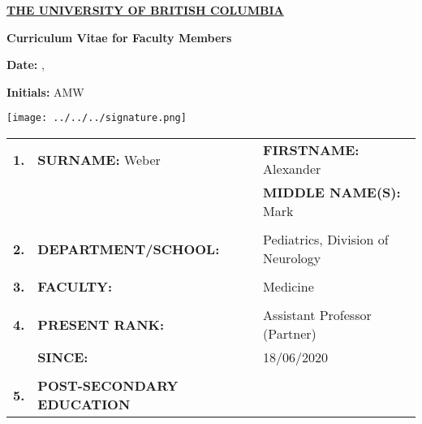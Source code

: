 \documentclass[11pt,notitlepage,english]{report}
\makeatletter
\newcommand{\monthyeardate}{%
  \DTMenglishmonthname{\@dtm@month}, \@dtm@year
}
\makeatother
\begin{document}
\begin{center}
  \underline{\textbf{THE UNIVERSITY OF BRITISH COLUMBIA}}
  \vspace{10pt}

  \textbf{Curriculum Vitae for Faculty Members}
\end{center}

\noindent %
\begin{minipage}[t]{0.33\textwidth}
  \raggedright
  \textbf{Date:} \monthyeardate
\end{minipage}%
\begin{minipage}[t]{0.33\textwidth}
  \begin{center}
    \textbf{Initials:} AMW \hspace{10pt} 
  \end{center}
\end{minipage}%
\begin{minipage}[t]{0.33\textwidth}
  \raggedleft
  \texttt{[image: ../../../signature.png]}
\end{minipage}

\vspace{15pt}

\begin{tabular}{L{.5cm} L{8cm} L{6.9cm}}
  \textbf{1.} & \textbf{SURNAME:} Weber                       & \textbf{FIRSTNAME:} Alexander      \\
              &                                               & \textbf{MIDDLE NAME(S):} Mark      \\
              \\
  \textbf{2.} & \textbf{DEPARTMENT/SCHOOL:}                   & Pediatrics, Division of Neurology \\
  \\
  \textbf{3.} & \textbf{FACULTY:}                             & Medicine                           \\
  \\
  \textbf{4.} & \textbf{PRESENT RANK:}                        & Assistant Professor (Partner)      \\
              & \textbf{SINCE:}                               & 18/06/2020                         \\
              \\
  \textbf{5.} & \textbf{POST-SECONDARY EDUCATION}
\end{tabular}
\end{document}
